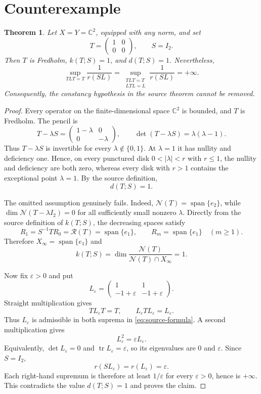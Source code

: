 \documentclass[11pt]{article}
\newtheorem{theorem}{Theorem}
\newcommand{\C}{\mathbb C}
\newcommand{\Nul}{\mathcal N}
\newcommand{\Ran}{\mathcal R}
\begin{document}
\section{Counterexample}

\begin{theorem}\label{thm:counterexample}
Let $X=Y=\C^2$, equipped with any norm, and set
\[
T=\begin{pmatrix}1&0\\0&0\end{pmatrix},
\qquad S=I_2.
\]
Then $T$ is Fredholm, $k(T;S)=1$, and $d(T;S)=1$.  Nevertheless,
\[
\sup_{TLT=T}\frac1{r(SL)}
=
\sup_{\substack{TLT=T\\LTL=L}}\frac1{r(SL)}
=+\infty.
\]
Consequently, the constancy hypothesis in the source theorem cannot be
removed.
\end{theorem}

\begin{proof}
Every operator on the finite-dimensional space $\C^2$ is bounded, and $T$
is Fredholm.  The pencil is
\[
T-\lambda S=
\begin{pmatrix}1-\lambda&0\\0&-\lambda\end{pmatrix},
\qquad
\det(T-\lambda S)=\lambda(\lambda-1).
\]
Thus $T-\lambda S$ is invertible for every
$\lambda\notin\{0,1\}$.  At $\lambda=1$ it has nullity and deficiency
one.  Hence, on every punctured disk $0<|\lambda|<r$ with $r\leq1$,
the nullity and deficiency are both zero, whereas every disk with $r>1$
contains the exceptional point $\lambda=1$.  By the source definition,
\[
d(T;S)=1.
\]

The omitted assumption genuinely fails.  Indeed,
$\Nul(T)=\operatorname{span}\{e_2\}$, while
$\dim\Nul(T-\lambda I_2)=0$ for all sufficiently small nonzero
$\lambda$.  Directly from the source definition of $k(T;S)$, the decreasing
spaces satisfy
\[
R_1=S^{-1}TR_0=\Ran(T)=\operatorname{span}\{e_1\},
\qquad R_m=\operatorname{span}\{e_1\}\quad(m\geq1).
\]
Therefore $X_\infty=\operatorname{span}\{e_1\}$ and
\[
k(T;S)=\dim\frac{\Nul(T)}{\Nul(T)\cap X_\infty}=1.
\]

Now fix $\varepsilon>0$ and put
\[
L_\varepsilon=
\begin{pmatrix}
1&1\\
-1+\varepsilon&-1+\varepsilon
\end{pmatrix}.
\]
Straight multiplication gives
\[
TL_\varepsilon T=T,
\qquad
L_\varepsilon T L_\varepsilon=L_\varepsilon.
\]
Thus $L_\varepsilon$ is admissible in both suprema in
\eqref{eq:source-formula}.  A second multiplication gives
\[
L_\varepsilon^2=\varepsilon L_\varepsilon.
\]
Equivalently, $\det L_\varepsilon=0$ and
$\operatorname{tr}L_\varepsilon=\varepsilon$, so its eigenvalues are
$0$ and $\varepsilon$.  Since $S=I_2$,
\[
r(SL_\varepsilon)=r(L_\varepsilon)=\varepsilon.
\]
Each right-hand supremum is therefore at least $1/\varepsilon$ for every
$\varepsilon>0$, hence is $+\infty$.  This contradicts the value
$d(T;S)=1$ and proves the claim.
\end{proof}
\end{document}
